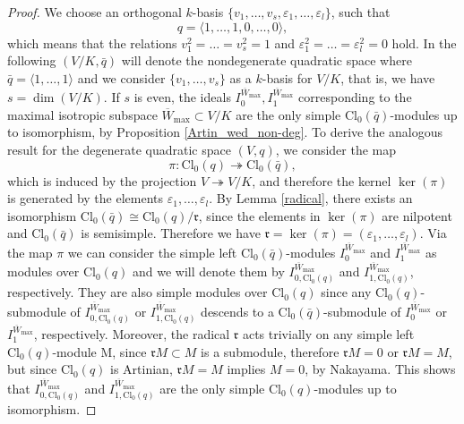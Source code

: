 \documentclass[a4paper, twoside, 11pt]{amsart}
\theoremstyle{definition}
\theoremstyle{remark}
\numberwithin{equation}{theorem}
\newcommand{\evencl}{\mathrm{Cl}_0}
\begin{document}
\begin{proof}
    We choose an orthogonal $k$-basis $\{v_1, \dots, v_s, \varepsilon_1, \dots, \varepsilon_l\}$, such that 
    \begin{equation*}
        q=\langle1,\dots,1,0,\dots,0\rangle,
    \end{equation*}
    which means that the relations $v_1^2=\dots=v_s^2=1$ and $\varepsilon_1^2=\dots=\varepsilon_l^2=0$ hold. In the following $(V/K, \bar{q})$ will denote the nondegenerate quadratic space where $\bar{q} = \langle 1,\dots,1\rangle$ and we consider $\{v_1,\dots,v_s\}$ as a $k$-basis for $V/K$, that is, we have $s =\dim(V/K)$. If $s$ is even, the ideals $I_0^{\overline{W}_{\text{max}}}, I_1^{\overline{W}_{\text{max}}} $ corresponding to the maximal isotropic subspace $\overline{W}_{\text{max}} \subset V/K$ are the only simple $\evencl(\bar{q})$-modules up to isomorphism, by Proposition \ref{Artin_wed_non-deg}. To derive the analogous result for the degenerate quadratic space $(V,q)$, we consider the map 
    \begin{equation}\label{projection}
        \pi\colon\evencl(q) \twoheadrightarrow \evencl(\bar{q}), 
    \end{equation}
    which is induced by the projection $V \twoheadrightarrow V/K$, and therefore the kernel $\ker(\pi)$ is generated by the elements $\varepsilon_1, \dots,\varepsilon_l$. By Lemma \ref{radical}, there exists an isomorphism $\evencl(\bar{q}) \cong \evencl(q)/\mathfrak{r}$, since the elements in $\ker(\pi)$ are nilpotent and $\evencl(\bar{q})$ is semisimple. Therefore we have $\mathfrak{r} =\ker(\pi) = (\varepsilon_1,\dots,\varepsilon_l)$. Via the map $\pi$ we can consider the simple left $\evencl(\bar{q})$-modules $I_0^{\overline{W}_{\text{max}}}$ and $ I_1^{\overline{W}_{\text{max}}} $ as modules over $\evencl(q)$ and we will denote them by $I_{0,\evencl(q)}^{\overline{W}_{\text{max}}}$ and $I_{1,\evencl(q)}^{\overline{W}_{\text{max}}}$, respectively. They are also simple modules over $\evencl(q)$ since any $\evencl(q)$-submodule of $I_{0,\evencl(q)}^{\overline{W}_{\text{max}}}$ or $I_{1,\evencl(q)}^{\overline{W}_{\text{max}}}$ descends to a $\evencl(\bar{q})$-submodule of $I_0^{\overline{W}_{\text{max}}}$ or $ I_1^{\overline{W}_{\text{max}}}$, respectively. Moreover, the radical $\mathfrak{r}$ acts trivially on any simple left $\evencl(q)$-module M, since $\mathfrak{r}M \subset M$ is a submodule, therefore $\mathfrak{r}M = 0$ or $\mathfrak{r}M = M$, but since $\evencl(q)$ is Artinian, $\mathfrak{r}M = M$ implies $M = 0$, by Nakayama. This shows that $I_{0,\evencl(q)}^{\overline{W}_{\text{max}}}$ and $I_{1,\evencl(q)}^{\overline{W}_{\text{max}}}$ are the only simple $\evencl(q)$-modules up to isomorphism.
    

\end{proof}
\end{document}
